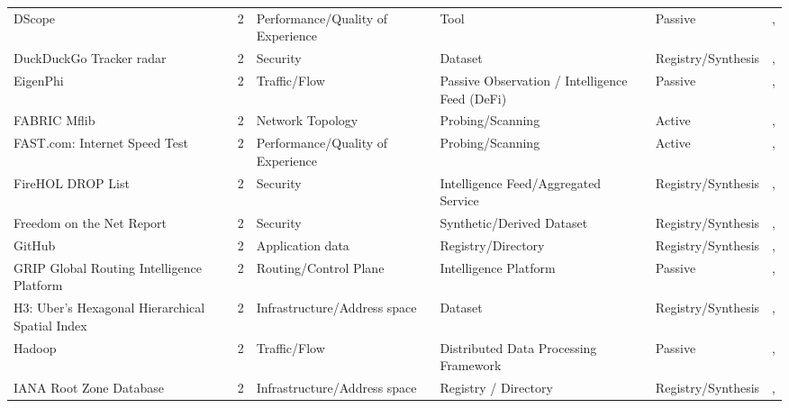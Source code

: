 \documentclass[11pt,a4paper]{article}
\begin{document}
\begin{longtable}{@{}p{}p{}p{}p{}p{}p{}p{}@{}}
DScope & \cite{dscope-tool} & 2 & Performance/Quality of Experience & Tool & Passive & \cite{10.1007/978-3-031-85960-1_4}, \cite{10.1145/3777912.3809148} \\
DuckDuckGo Tracker radar & \cite{ddg-tracker-radar} & 2 & Security & Dataset & Registry/Synthesis & \cite{10.1145/3618257.3624803}, \cite{10.1145/3777912.3839787} \\
EigenPhi & \cite{eigenphi} & 2 & Traffic/Flow & Passive Observation / Intelligence Feed (DeFi) & Passive & \cite{10.1145/3618257.3624824}, \cite{10.1145/3777912.3809150} \\
FABRIC Mflib & \cite{fabric_mflib} & 2 & Network Topology & Probing/Scanning & Active & \cite{10.1145/3730567.3764462}, \cite{10.1007/978-3-031-85960-1_10} \\
FAST.com: Internet Speed Test & \cite{fast_com} & 2 & Performance/Quality of Experience & Probing/Scanning & Active & \cite{10.1145/3730567.3764473}, \cite{10.1007/978-3-030-98785-5_4} \\
FireHOL DROP List & \cite{firehol_drop} & 2 & Security & Intelligence Feed/Aggregated Service & Registry/Synthesis & \cite{10.1145/3517745.3561454}, \cite{10.1007/978-3-030-72582-2_4} \\
Freedom on the Net Report & \cite{freedom_house_fotn} & 2 & Security & Synthetic/Derived Dataset & Registry/Synthesis & \cite{10.1145/3487552.3487822}, \cite{10.1007/978-3-030-98785-5_23} \\
GitHub & \cite{github} & 2 & Application data & Registry/Directory & Registry/Synthesis & \cite{10.1007/978-3-030-72582-2_5}, \cite{10.1007/978-3-030-98785-5_30} \\
GRIP Global Routing Intelligence Platform & \cite{grip_platform} & 2 & Routing/Control Plane & Intelligence Platform & Passive & \cite{10.1007/978-3-031-28486-1_15}, \cite{10.1007/978-3-032-18268-5_1} \\
H3: Uber’s Hexagonal Hierarchical Spatial Index & \cite{h3_grid} & 2 & Infrastructure/Address space & Dataset & Registry/Synthesis & \cite{10.1145/3646547.3688441}, \cite{10.1007/978-3-031-85960-1_20} \\
Hadoop & \cite{hadoop_streaming} & 2 & Traffic/Flow & Distributed Data Processing Framework & Passive & \cite{10.1145/3730567.3764459}, \cite{10.1007/978-3-032-18268-5_16} \\
IANA Root Zone Database & \cite{iana_root_zone} & 2 & Infrastructure/Address space & Registry / Directory & Registry/Synthesis & \cite{10.1145/3618257.3624836}, \cite{10.1145/3777912.3809157} \\

\end{longtable}
\end{document}
